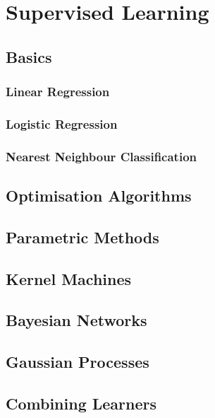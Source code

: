 \section{Supervised Learning}

\subsection{Basics}

\subsubsection{Linear Regression}

\subsubsection{Logistic Regression}

\subsubsection{Nearest Neighbour Classification}

\subsection{Optimisation Algorithms}

\subsection{Parametric Methods}

\subsection{Kernel Machines}

\subsection{Bayesian Networks}

\subsection{Gaussian Processes}

\subsection{Combining Learners}